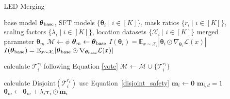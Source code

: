 
\begin{algorithm}[!ht]
    \caption{LED-Merging}
    \label{alg1}
    \begin{algorithmic}[1]
        \REQUIRE  base model $\boldsymbol{\theta}_{\rm{base}}$, SFT models $\{\boldsymbol{\theta}_{i}\mid i\in [K]\}$, mask ratios \{$r_{i} \mid i\in [K]\}$, scaling factors $\{\lambda_i\mid i\in[K]\}$, location datasets $\{\mathcal{X}_{i}\mid i\in[K]\}$
        \ENSURE merged parameter $\boldsymbol{\theta}_{m}$
        \STATE $\mathcal{M}\leftarrow\phi$
        \STATE $\boldsymbol{\theta}_{m}\leftarrow \boldsymbol{\theta}_{\rm{base}}$
        \STATE $I(\boldsymbol{\theta}_i)=\mathbb{E}_{x\sim \mathcal{X}_i}|\boldsymbol{\theta}_{i}\odot \nabla_{\boldsymbol{\theta}_i}\mathcal{L}(x)|$
        \STATE $I(\boldsymbol{\theta}_{\rm{base}})=\mathbb{E}_{x\sim \mathcal{X}_i}|\boldsymbol{\theta}_{\rm{base}}\odot \nabla_{\boldsymbol{\theta}_{\rm{base}}}\mathcal{L}(x)|$
        
        \STATE calculate $\mathcal{T}^{r_i}_{i}$ following Equation \ref{vote}
        \STATE  $\mathcal{M}\leftarrow \mathcal{M}\cup\{\mathcal{T}^{r_i}_i\}$
       
        
   
        
        
        \ENDFOR  
        
        \STATE calculate $\text{Disjoint}(\mathcal{T}_i^{r_i})$ use Equation~\ref{disjoint_safety}
        \STATE $\boldsymbol{m}_i \leftarrow \boldsymbol{0}$
        \STATE $\boldsymbol{m}_{i,d}=1$
        \ENDFOR
        \STATE $\boldsymbol{\theta}_{m}\leftarrow \boldsymbol{\theta}_{m}+\lambda_i \boldsymbol{\tau}_i\odot \boldsymbol{m}_{i}$
        \ENDFOR
    \end{algorithmic}
\end{algorithm}
